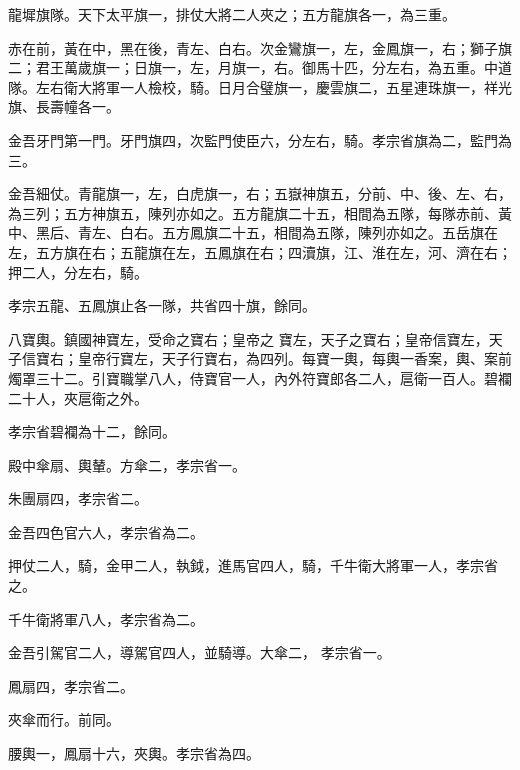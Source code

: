\begin{pinyinscope}
 龍墀旗隊。天下太平旗一，排仗大將二人夾之；五方龍旗各一，為三重。



 赤在前，黃在中，黑在後，青左、白右。次金鸞旗一，左，金鳳旗一，右；獅子旗二；君王萬歲旗一；日旗一，左，月旗一，右。御馬十匹，分左右，為五重。中道隊。左右衛大將軍一人檢校，騎。日月合璧旗一，慶雲旗二，五星連珠旗一，祥光旗、長壽幢各一。



 金吾牙門第一門。牙門旗四，次監門使臣六，分左右，騎。孝宗省旗為二，監門為三。



 金吾細仗。青龍旗一，左，白虎旗一，右；五嶽神旗五，分前、中、後、左、右，為三列；五方神旗五，陳列亦如之。五方龍旗二十五，相間為五隊，每隊赤前、黃中、黑后、青左、白右。五方鳳旗二十五，相間為五隊，陳列亦如之。五岳旗在左，五方旗在右；五龍旗在左，五鳳旗在右；四瀆旗，江、淮在左，河、濟在右；押二人，分左右，騎。



 孝宗五龍、五鳳旗止各一隊，共省四十旗，餘同。



 八寶輿。鎮國神寶左，受命之寶右；皇帝之
 寶左，天子之寶右；皇帝信寶左，天子信寶右；皇帝行寶左，天子行寶右，為四列。每寶一輿，每輿一香案，輿、案前燭罩三十二。引寶職掌八人，侍寶官一人，內外符寶郎各二人，扈衛一百人。碧襴二十人，夾扈衛之外。



 孝宗省碧襴為十二，餘同。



 殿中傘扇、輿輦。方傘二，孝宗省一。



 朱團扇四，孝宗省二。



 金吾四色官六人，孝宗省為二。



 押仗二人，騎，金甲二人，執鉞，進馬官四人，騎，千牛衛大將軍一人，孝宗省之。



 千牛衛將軍八人，孝宗省為二。



 金吾引駕官二人，導駕官四人，並騎導。大傘二，
 孝宗省一。



 鳳扇四，孝宗省二。



 夾傘而行。前同。



 腰輿一，鳳扇十六，夾輿。孝宗省為四。




\end{pinyinscope}
